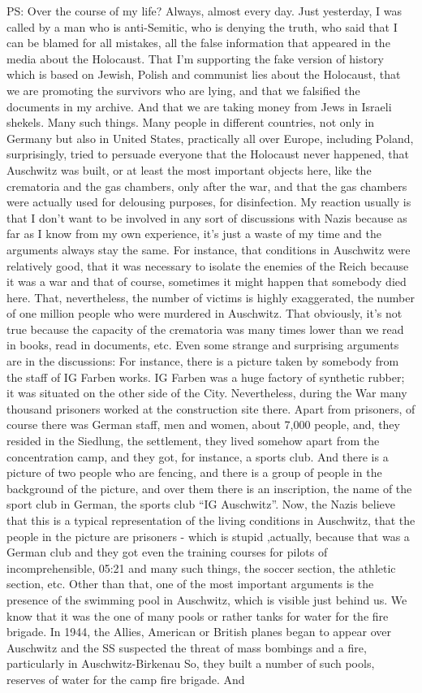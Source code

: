 PS: Over the course of my life? Always, almost every day. Just yesterday, I was called by a man who is anti-Semitic, who is denying the truth, who said that I can be blamed for all mistakes, all the false information that appeared in the media about the Holocaust. That I'm supporting the fake version of history which is based on Jewish, Polish and communist lies about the Holocaust, that we are promoting the survivors who are lying, and that we falsified the documents in my archive. And that we are taking money from Jews in Israeli shekels. Many such things. Many people in different countries, not only in Germany but also in United States, practically all over Europe, including Poland, surprisingly, tried to persuade everyone that the Holocaust never happened, that Auschwitz was built, or at least the most important objects here, like the crematoria and the gas chambers, only after the war, and that the gas chambers were actually used for delousing purposes, for disinfection. My reaction usually is that I don't want to be involved in any sort of discussions with Nazis because as far as I know from my own experience, it's just a waste of my time and the arguments always stay the same. For instance, that conditions in Auschwitz were relatively good, that it was necessary to isolate the enemies of the Reich because it was a war and that of course, sometimes it might happen that somebody died here. That, nevertheless, the number of victims is highly exaggerated, the number of one million people who were murdered in Auschwitz. That obviously, it's not true because the capacity of the crematoria was many times lower than we read in books, read in documents, etc. Even some strange and surprising arguments are in the discussions: For instance, there is a picture taken by somebody from the staff of IG Farben works. IG Farben was a huge factory of synthetic rubber; it was situated on the other side of the City. Nevertheless, during the War many thousand prisoners worked at the construction site there. Apart from prisoners, of course there was German staff, men and women, about 7,000 people, and, they resided in the Siedlung, the settlement, they lived somehow apart from the concentration camp, and they got, for instance, a sports club. And there is a picture of two people who are fencing, and there is a group of people in the background of the picture, and over them there is an inscription, the name of the sport club in German, the sports club “IG Auschwitz”. Now, the Nazis believe that this is a typical representation of the living conditions in Auschwitz, that the people in the picture are prisoners - which is stupid ,actually, because that was a German club and they got even the training courses for pilots of incomprehensible, 05:21 and many such things, the soccer section, the athletic section, etc. Other than that, one of the most important arguments is the presence of the swimming pool in Auschwitz, which is visible just behind us. We know that it was the one of many pools or rather tanks for water for the fire brigade. In 1944, the Allies, American or British planes began to appear over Auschwitz and the SS suspected the threat of mass bombings and a fire, particularly in Auschwitz-Birkenau So, they built a number of such pools, reserves of water for the camp fire brigade. And 